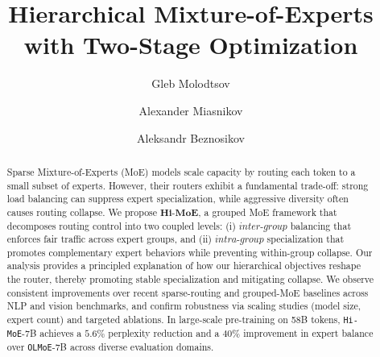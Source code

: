 \documentclass[sigconf,nonacm]{acmart}
\renewcommand\shortauthors{}
\begin{document}
\title[Hierarchical MoE with Two-Stage Optimization]%
{Hierarchical Mixture-of-Experts with Two-Stage Optimization}

\author{Gleb Molodtsov}

\author{Alexander Miasnikov}
\authornotemark[1]

\author{Aleksandr Beznosikov}

\renewcommand{\shortauthors}{Molodtsov et al. 2026}

\begin{abstract}
Sparse Mixture-of-Experts (MoE) models scale capacity by routing each token to a small subset of experts. However, their routers exhibit a fundamental trade-off: strong load balancing can suppress expert specialization, while aggressive diversity often causes routing collapse.
We propose $\textbf{Hi-MoE}$, a grouped MoE framework that decomposes routing control into two coupled levels: (i) $\textit{inter-group}$ balancing that enforces fair traffic across expert groups, and (ii) $\textit{intra-group}$ specialization that promotes complementary expert behaviors while preventing within-group collapse.
Our analysis provides a principled explanation of how our hierarchical objectives reshape the router, thereby promoting stable specialization and mitigating collapse.
We observe consistent improvements over recent sparse-routing and grouped-MoE baselines across NLP and vision benchmarks, and confirm robustness via scaling studies (model size, expert count) and targeted ablations. 
In large-scale pre-training on 58B tokens, \texttt{Hi-MoE}-7B achieves a $5.6\%$ perplexity reduction and a $40\%$ improvement in expert balance over \texttt{OLMoE}-7B across diverse evaluation domains. 
\end{abstract}

\end{document}
